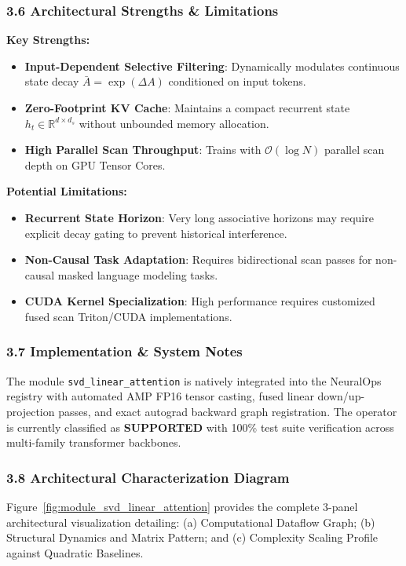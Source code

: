 \subsubsection*{3.6 Architectural Strengths \& Limitations}
\textbf{Key Strengths:}
\begin{itemize}
    \item \textbf{Input-Dependent Selective Filtering}: Dynamically modulates continuous state decay $\bar{A} = \exp(\Delta A)$ conditioned on input tokens.
    \item \textbf{Zero-Footprint KV Cache}: Maintains a compact recurrent state $h_t \in \mathbb{R}^{d \times d_s}$ without unbounded memory allocation.
    \item \textbf{High Parallel Scan Throughput}: Trains with $\mathcal{O}(\log N)$ parallel scan depth on GPU Tensor Cores.
\end{itemize}

\textbf{Potential Limitations:}
\begin{itemize}
    \item \textbf{Recurrent State Horizon}: Very long associative horizons may require explicit decay gating to prevent historical interference.
    \item \textbf{Non-Causal Task Adaptation}: Requires bidirectional scan passes for non-causal masked language modeling tasks.
    \item \textbf{CUDA Kernel Specialization}: High performance requires customized fused scan Triton/CUDA implementations.
\end{itemize}

\subsubsection*{3.7 Implementation \& System Notes}
The module \texttt{svd\_linear\_attention} is natively integrated into the NeuralOps registry with automated AMP FP16 tensor casting, fused linear down/up-projection passes, and exact autograd backward graph registration. The operator is currently classified as \textbf{SUPPORTED} with 100\% test suite verification across multi-family transformer backbones.

\subsubsection*{3.8 Architectural Characterization Diagram}
Figure~\ref{fig:module_svd_linear_attention} provides the complete 3-panel architectural visualization detailing: (a) Computational Dataflow Graph; (b) Structural Dynamics and Matrix Pattern; and (c) Complexity Scaling Profile against Quadratic Baselines.

